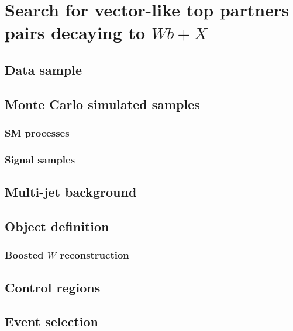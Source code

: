 \clearpage{\pagestyle{empty}\cleardoublepage}

\chapter{Search for vector-like top partners pairs decaying to $Wb+X$}\label{chap:wbx}

\section{Data sample}\label{sec:data}

\section{Monte Carlo simulated samples}\label{sec:MCbkg}

\subsection{SM processes}\label{subsec:MCsmbkg}

\subsection{Signal samples}\label{subsec:MCsignal}

\section{Multi-jet background}\label{sec:qcdbkg}


\section{Object definition}\label{sec:}
\subsection{Boosted $W$ reconstruction}\label{subsec:boostedW}


\section{Control regions}\label{sec:}

\section{Event selection}\label{sec:}

\section{}\label{sec:}

\section{}\label{sec:}

\section{}\label{sec:}

